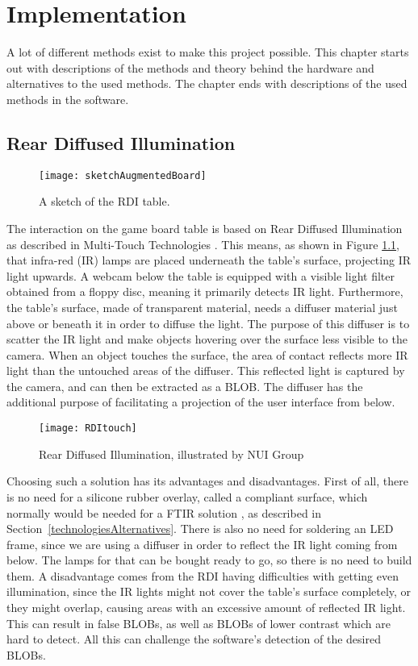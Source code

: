
\chapter{Implementation}\label{ch:implementation}
A lot of different methods exist to make this project possible. This chapter starts out with descriptions of the methods and theory behind the hardware and alternatives to the used methods. The chapter ends with descriptions of the used methods in the software. 


\section{Rear Diffused Illumination} \label{sec:RDI}
\begin{figure}[!h]
\centering	\texttt{[image: sketchAugmentedBoard]}
 \caption{A sketch of the RDI table.\label{Fig:sketch}}
\end{figure}
The interaction on the game board table is based on Rear Diffused Illumination as described in Multi-Touch Technologies \citep{multiTT}. This means, as shown in Figure \ref{Fig:sketch}, that infra-red (IR) lamps are placed underneath the table's surface, projecting IR light upwards. A webcam below the table is equipped with a visible light filter obtained from a floppy disc, meaning it primarily detects IR light. Furthermore, the table's surface, made of transparent material, needs a diffuser material just above or beneath it in order to diffuse the light. The purpose of this diffuser is to scatter the IR light and make objects hovering over the surface less visible to the camera. When an object touches the surface, the area of contact reflects more IR light than the untouched areas of the diffuser. This reflected light is captured by the camera, and can then be extracted as a BLOB. The diffuser has the additional purpose of facilitating a projection of the user interface from below.

\begin{figure}[!h]
\centering	\texttt{[image: RDItouch]}
 \caption{Rear Diffused Illumination, illustrated by NUI Group \citep{multiTT}\label{Fig:RDI}}
\end{figure}

Choosing such a solution has its advantages and disadvantages. First of all, there is no need for a silicone rubber overlay, called a compliant surface, which normally would be needed for a FTIR solution \citep{multiTT}, as described in Section~\ref{technologiesAlternatives}. There is also no need for soldering an LED frame, since we are using a diffuser in order to reflect the IR light coming from below. The lamps for that can be bought ready to go, so there is no need to build them. A disadvantage comes from the RDI having difficulties with getting even illumination, since the IR lights might not cover the table's surface completely, or they might overlap, causing areas with an excessive amount of reflected IR light. This can result in false BLOBs, as well as BLOBs of lower contrast which are hard to detect. All this can challenge the software's detection of the desired BLOBs.

